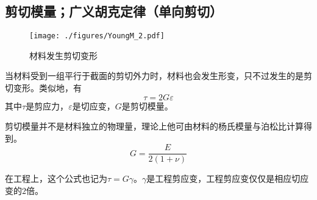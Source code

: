\subsection{剪切模量；广义胡克定律（单向剪切）}
\begin{figure}[ht]
\centering
\texttt{[image: ./figures/YoungM\_2.pdf]}
\caption{材料发生剪切变形} \label{YoungM_fig2}
\end{figure}
当材料受到一组平行于截面的剪切外力时，材料也会发生形变，只不过发生的是剪切变形。类似地，有
\begin{equation}
\tau=2G\varepsilon
\end{equation}
其中$\tau$是剪应力，$\varepsilon$是切应变，$G$是剪切模量。

剪切模量并不是材料独立的物理量，理论上他可由材料的杨氏模量与泊松比计算得到。
\begin{equation}
G = \frac{E}{2(1+\nu)}
\end{equation}

在工程上，这个公式也记为$\tau=G\gamma$。$\gamma$是工程剪应变，工程剪应变仅仅是相应切应变的$2$倍。
